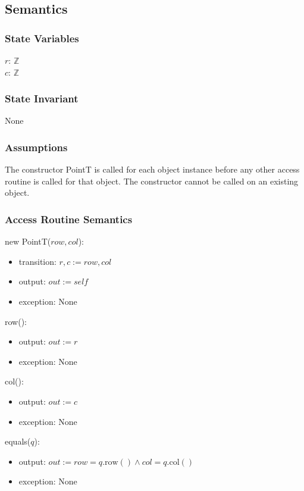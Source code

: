 \documentclass[12pt]{article}
\begin{document}
\subsection* {Semantics}

\subsubsection* {State Variables}

$r$: $\mathbb{Z}$\\
$c$: $\mathbb{Z}$

\subsubsection* {State Invariant}

None

\subsubsection* {Assumptions}

The constructor PointT is called for each object instance before any other
access routine is called for that object.  The constructor cannot be called on
an existing object.

\subsubsection* {Access Routine Semantics}

new PointT($row, col$):
\begin{itemize}
	\item transition: $r, c := row, col$
	\item output: $out := \mathit{self}$
	\item exception: None
\end{itemize}

\noindent row():
\begin{itemize}
	\item output: $out := r$
	\item exception: None
\end{itemize}

\noindent col():
\begin{itemize}
	\item output: $out := c$
	\item exception: None
\end{itemize}

\noindent equals($q$):
\begin{itemize}
	\item output: $out := row = q.\mbox{row}() \land col = q.\mbox{col}()$
	\item exception: None
\end{itemize}
\end{document}
